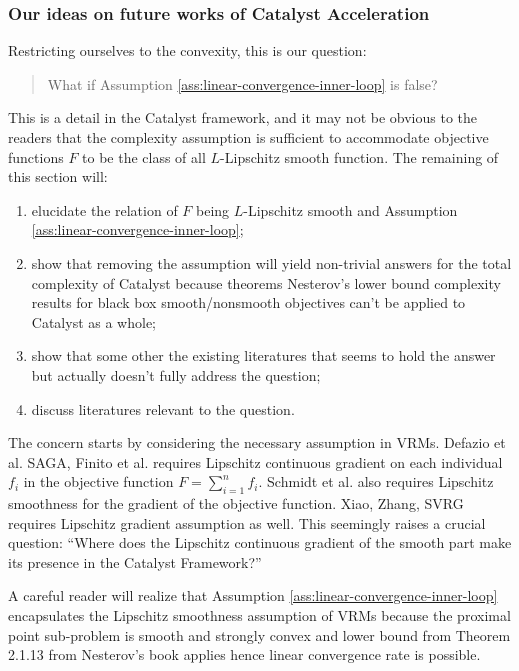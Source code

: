 \documentclass[12pt]{article}
\begin{document}
        \subsubsection{Our ideas on future works of Catalyst Acceleration}
            Restricting ourselves to the convexity, this is our question: 
            \begin{quote}
                What if Assumption \ref{ass:linear-convergence-inner-loop} is false? 
            \end{quote}
            This is a detail in the Catalyst framework, and it may not be obvious to the readers that the complexity assumption is sufficient to accommodate objective functions $F$ to be the class of all $L$-Lipschitz smooth function. 
            The remaining of this section will: 
            \begin{enumerate}
                \item elucidate the relation of $F$ being $L$-Lipschitz smooth and Assumption \ref{ass:linear-convergence-inner-loop}; 
                \item show that removing the assumption will yield non-trivial answers for the total complexity of Catalyst because theorems Nesterov's lower bound complexity results for black box smooth/nonsmooth objectives can't be applied to Catalyst as a whole;
                \item show that some other the existing literatures that seems to hold the answer but actually doesn't fully address the question; 
                \item discuss literatures relevant to the question. 
            \end{enumerate}
            \par
            The concern starts by considering the necessary assumption in VRMs. 
            Defazio et al. \cite{defazio_saga_2014} SAGA, Finito et al. \cite{defazio_finito_2014} requires Lipschitz continuous gradient on each individual $f_i$ in the objective function $F = \sum_{i = 1}^n f_i$. 
            Schmidt et al. \cite{schmidt_minimizing_2017} also requires Lipschitz smoothness for the gradient of the objective function. 
            Xiao, Zhang, SVRG \cite{xiao_proximal_2014} requires Lipschitz gradient assumption as well. 
            This seemingly raises a crucial question: ``Where does the Lipschitz continuous gradient of the smooth part make its presence in the Catalyst Framework?''
            \par
            A careful reader will realize that Assumption \ref{ass:linear-convergence-inner-loop} encapsulates the Lipschitz smoothness assumption of VRMs because the proximal point sub-problem is smooth and strongly convex and lower bound from Theorem 2.1.13 from Nesterov's book \cite{nesterov_lectures_2018} applies hence linear convergence rate is possible. 
\end{document}
